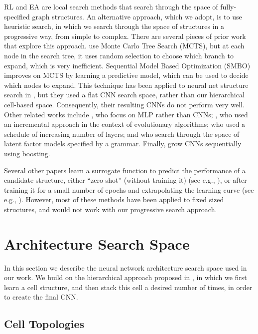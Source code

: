\documentclass[runningheads]{llncs}
\begin{document}
RL and EA are local search methods that search through the space of fully-specified graph structures. An alternative approach, which we adopt, is to use heuristic search, in which we search through the space of structures in a progressive way, from simple to complex.
There are several pieces of prior work that explore this approach.
\cite{Negrinho2017} use Monte Carlo Tree Search (MCTS),
but at each node in the search tree, it uses random selection to choose which branch to expand,
which is very inefficient.
Sequential Model Based Optimization (SMBO) \cite{Hutter2011} improves on MCTS by learning a predictive model, which can be used to decide which nodes to expand.
This technique has been applied to neural net structure search in
\cite{Negrinho2017},
but they used a flat CNN search space, rather than our hierarchical cell-based space.
Consequently, their resulting CNNs do not perform very well.
Other related works include
\cite{Mendoza2016}, who focus on MLP rather than CNNs;
\cite{Stanley2002}, who used an incremental approach in the context of evolutionary algorithms; \cite{DBLP:journals/corr/ZophL16} who used a schedule of increasing number of layers;
and \cite{Grosse2012} who 
search through the space of latent factor models specified by a grammar.
Finally, \cite{Cortes2016,Huang2017boosting} grow CNNs sequentially using boosting.


Several other papers learn a surrogate function to predict the performance of a candidate structure, either ``zero shot'' (without training it)
(see e.g., \cite{SMASH}),
or after training it for a small number of epochs and extrapolating the learning curve
(see e.g.,  \cite{Domhan2015,Baker2017acc}).
However, most of these methods have been applied to fixed sized structures, and would not work with our progressive search approach.


\section{Architecture Search Space}\label{sec:search}\label{sec:space}In this section we describe the neural network architecture search space used in our work.
We build on the hierarchical approach
proposed in  \cite{DBLP:journals/corr/ZophVSL17},
in which we first learn a cell structure, and then stack this cell a desired number of times,
in order to create the final CNN.

\subsection{Cell Topologies}
\end{document}
